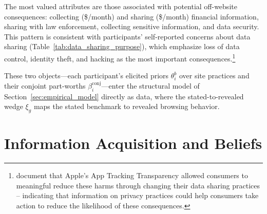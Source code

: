 \documentclass[12pt]{article}
\theoremstyle{definition}
\theoremstyle{remark}
\begin{document}
The most valued attributes are those associated with potential off-website consequences: collecting (\$\wtpCollectFinancial{}/month) and sharing (\$\wtpShareFinancial{}/month) financial information, sharing with law enforcement, collecting sensitive information, and data security. This pattern is consistent with participants' self-reported concerns about data sharing (Table~\ref{tab:data_sharing_purpose}), which emphasize loss of data control, identity theft, and hacking as the most important consequences.\footnote{\cite{bian2023consumer} document that Apple's App Tracking Transparency allowed consumers to meaningful reduce these harms through changing their data sharing practices -- indicating that information on privacy practices could help consumers take action to reduce the likelihood of these consequences.}


These two objects---each participant's elicited priors $\theta^b_i$ over site practices and their conjoint part-worths $\beta^{\text{conj}}_i$---enter the structural model of Section~\ref{sec:empirical_model} directly as data, where the stated-to-revealed wedge $\xi_g$ maps the stated benchmark to revealed browsing behavior.

\section{Information Acquisition and Beliefs}\label{sec:hyp_info_beliefs}
\end{document}
